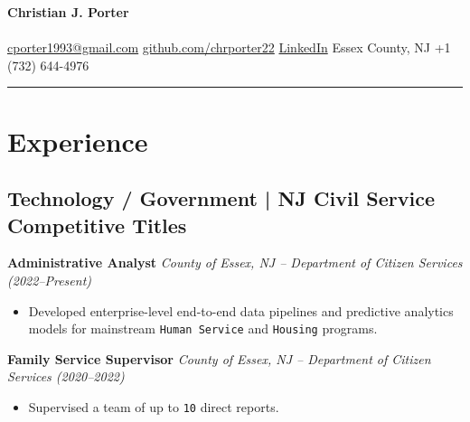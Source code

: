 \documentclass[11pt,a4paper]{article}
\newcommand{\name}{\textbf{\Large Christian J. Porter}}
\begin{document}
\pagestyle{empty}

\begin{center}
  {\small \name} \\[-0.2em]
  {\titletext} \\[-0.1em]
  {\href{mailto:cporter1993@gmail.com}{cporter1993@gmail.com} \quad
  \href{https://github.com/chrporter22}{github.com/chrporter22} \quad
  \href{https://www.linkedin.com/in/christian-j-porter/}{LinkedIn} \quad
  Essex County, NJ \quad
  +1 (732) 644-4976}
\end{center}

\vspace{0.5mm}
\hrule
\vspace{0.5mm}

\section*{Experience}

\subsection*{Technology / Government | NJ Civil Service Competitive Titles}

\par\noindent\textbf{Administrative Analyst}  
\newline\textit{County of Essex, NJ – Department of Citizen Services (2022–Present)}  
\begin{itemize}
  \item Developed enterprise-level end-to-end data pipelines and predictive analytics models for mainstream \texttt{Human Service} and \texttt{Housing} programs.
\end{itemize}

\par\noindent\textbf{Family Service Supervisor}  
\newline\textit{County of Essex, NJ – Department of Citizen Services (2020–2022)}  
\begin{itemize}
  \item Supervised a team of up to \texttt{10} direct reports.
\end{itemize}
\end{document}
